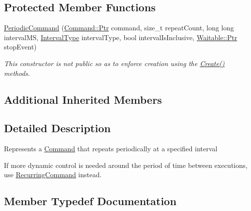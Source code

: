 \subsection*{Protected Member Functions}
\begin{DoxyCompactItemize}
\item 
\mbox{\hyperlink{class_command_lib_1_1_periodic_command_ae01a26a099f4ffd1006e9d8451568964}{Periodic\+Command}} (\mbox{\hyperlink{class_command_lib_1_1_command_a3b3e4f00144373299df5c6bb1acc319d}{Command\+::\+Ptr}} command, size\+\_\+t repeat\+Count, long long interval\+MS, \mbox{\hyperlink{class_command_lib_1_1_periodic_command_ac32ef93cf679cd652da30a0ad373d31e}{Interval\+Type}} interval\+Type, bool interval\+Is\+Inclusive, \mbox{\hyperlink{class_command_lib_1_1_waitable_ac74b6b91e48220146eada76a31cf2d9b}{Waitable\+::\+Ptr}} stop\+Event)
\begin{DoxyCompactList}\small\item\em This constructor is not public so as to enforce creation using the \mbox{\hyperlink{class_command_lib_1_1_periodic_command_aa553fa62e0e5774b39c1105caf3dd087}{Create()}} methods. \end{DoxyCompactList}\end{DoxyCompactItemize}
\subsection*{Additional Inherited Members}


\subsection{Detailed Description}
Represents a \mbox{\hyperlink{class_command_lib_1_1_command}{Command}} that repeats periodically at a specified interval

If more dynamic control is needed around the period of time between executions, use \mbox{\hyperlink{class_command_lib_1_1_recurring_command}{Recurring\+Command}} instead. 

\subsection{Member Typedef Documentation}
\mbox{\label{class_command_lib_1_1_periodic_command_ad004e7ccaad4b0413f341dac73d050fc}} 
